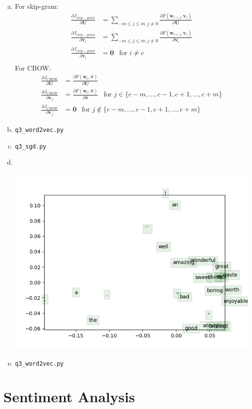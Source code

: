 \documentclass[11pt]{article}
\newcommand{\pder}[2][]{\frac{\partial#1}{\partial#2}}
\begin{document}
\begin{enumerate}[(a)]
  
\item For skip-gram:
  \begin{align*}
    \pder[J_{skip-gram}]{\bm{U}} &= \sum_{-m \leq j\leq m, j\neq 0} \pder[F(\bm{w}_{c+j}, \bm{v}_c)]{\bm{U}} \\
    \pder[J_{skip-gram}]{\bm{v}_c} &= \sum_{-m \leq j\leq m, j\neq 0} \pder[F(\bm{w}_{c+j}, \bm{v}_c)]{\bm{v}_c} \\
    \pder[J_{skip-gram}]{\bm{v}_i} &= \bm{0} \ \ \text{ for } i \neq c\\
  \end{align*}
  For CBOW:
  \begin{align*}
    \pder[J_{CBOW}]{\bm{U}} &= \pder[F(\bm{w}_c, \hat{\bm{v}})]{\bm{U}} \\
    \pder[J_{CBOW}]{\bm{v}_{j}} &= \pder[F(\bm{w}_c, \hat{\bm{v}})]{\hat{\bm{v}}} \ \ \text{ for } j \in \{c-m, ..., c-1, c+1, ..., c+m \} \\
    \pder[J_{CBOW}]{\bm{v}_{j}} &= \bm{0} \ \ \text{ for } j \notin \{c-m, ..., c-1, c+1, ..., c+m \}
  \end{align*}
\item \verb|q3_word2vec.py|
\item \verb|q3_sgd.py|
\item \
  \begin{center}
    \includegraphics[scale=0.8]{../assignment1/q3_word_vectors.png}
  \end{center}
\item \verb|q3_word2vec.py|
\end{enumerate}

\section{Sentiment Analysis}
\label{sec:4}
\end{document}
